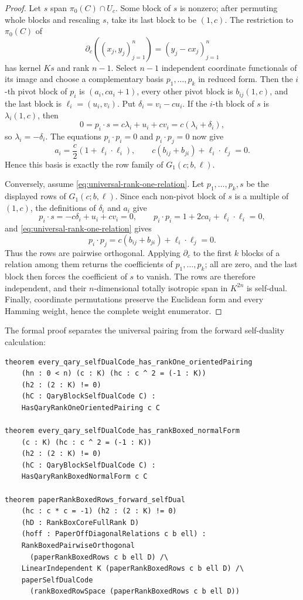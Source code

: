 \documentclass[12pt]{article}
\begin{document}
\begin{proof}
Let \(s\) span \(\pi_0(C)\cap U_c\).  Some block of \(s\) is nonzero;
after permuting whole blocks and rescaling \(s\), take its last block to be
\((1,c)\).  The restriction to \(\pi_0(C)\) of
\[
\partial_c((x_j,y_j)_{j=1}^n)=(y_j-cx_j)_{j=1}^n
\]
has kernel \(Ks\) and rank \(n-1\).  Select \(n-1\) independent coordinate
functionals of its image and choose a complementary basis
\(p_1,\ldots,p_k\) in reduced form.  Then the \(i\)-th pivot block of
\(p_i\) is \((a_i,ca_i+1)\), every other pivot block is
\(b_{ij}(1,c)\), and the last block is \(\ell_i=(u_i,v_i)\).  Put
\(\delta_i=v_i-cu_i\).  If the \(i\)-th block of \(s\) is
\(\lambda_i(1,c)\), then
\[
0=p_i\cdot s=c\lambda_i+u_i+cv_i
=c(\lambda_i+\delta_i),
\]
so \(\lambda_i=-\delta_i\).  The equations \(p_i\cdot p_i=0\) and
\(p_i\cdot p_j=0\) now give
\[
a_i=\frac c2(1+\ell_i\cdot\ell_i),
\qquad
c(b_{ij}+b_{ji})+\ell_i\cdot\ell_j=0.
\]
Hence this basis is exactly the row family of \(G_1(c;b,\ell)\).

Conversely, assume \eqref{eq:universal-rank-one-relation}.  Let
\(p_1,\ldots,p_k,s\) be the displayed rows of \(G_1(c;b,\ell)\).  Since
each non-pivot block of \(s\) is a multiple of \((1,c)\), the definitions of
\(\delta_i\) and \(a_i\) give
\[
p_i\cdot s=-c\delta_i+u_i+cv_i=0,
\qquad
p_i\cdot p_i=1+2ca_i+\ell_i\cdot\ell_i=0,
\]
and \eqref{eq:universal-rank-one-relation} gives
\[
p_i\cdot p_j=c(b_{ij}+b_{ji})+\ell_i\cdot\ell_j=0.
\]
Thus the rows are pairwise orthogonal.  Applying \(\partial_c\) to the
first \(k\) blocks of a relation among them returns the coefficients of
\(p_1,\ldots,p_k\); all are zero, and the last block then forces the
coefficient of \(s\) to vanish.  The rows are therefore independent, and
their \(n\)-dimensional totally isotropic span in \(K^{2n}\) is self-dual.
Finally, coordinate permutations preserve the Euclidean form and every
Hamming weight, hence the complete weight enumerator.
\end{proof}

\noindent
The formal proof separates the universal pairing from the forward
self-duality calculation:
\begin{lstlisting}[caption={Lean goals for Theorem~\ref{thm:qary-universal-rank-one}.}]
theorem every_qary_selfDualCode_has_rankOne_orientedPairing
    (hn : 0 < n) (c : K) (hc : c ^ 2 = (-1 : K))
    (h2 : (2 : K) != 0)
    (hC : QaryBlockSelfDualCode C) :
    HasQaryRankOneOrientedPairing c C

theorem every_qary_selfDualCode_has_rankBoxed_normalForm
    (c : K) (hc : c ^ 2 = (-1 : K))
    (h2 : (2 : K) != 0)
    (hC : QaryBlockSelfDualCode C) :
    HasQaryRankBoxedNormalForm c C

theorem paperRankBoxedRows_forward_selfDual
    (hc : c * c = -1) (h2 : (2 : K) != 0)
    (hD : RankBoxCoreFullRank D)
    (hoff : PaperOffDiagonalRelations c b ell) :
    RankBoxedPairwiseOrthogonal
      (paperRankBoxedRows c b ell D) /\
    LinearIndependent K (paperRankBoxedRows c b ell D) /\
    paperSelfDualCode
      (rankBoxedRowSpace (paperRankBoxedRows c b ell D))
\end{lstlisting}
\end{document}
